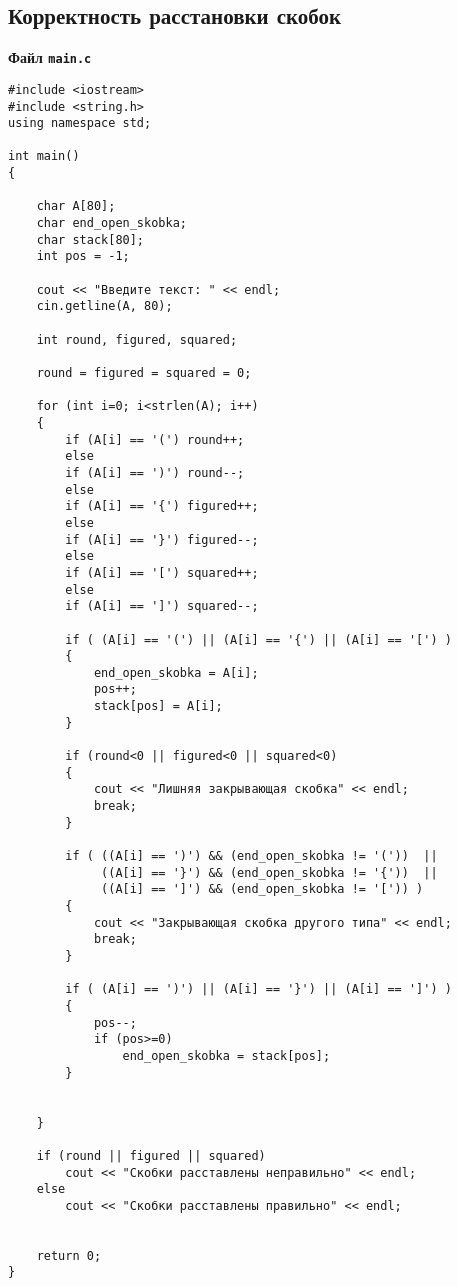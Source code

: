 \documentclass[a4paper,12pt]{extarticle}
\begin{document}
\subsection{Корректность расстановки скобок}\label{code:scobe}
\centerline{\textbf{Файл \texttt{main.c}}}
\begin{verbatim}
#include <iostream>
#include <string.h>
using namespace std;
 
int main()
{
 
    char A[80];
    char end_open_skobka; 
    char stack[80];
    int pos = -1;
 
    cout << "Введите текст: " << endl;
    cin.getline(A, 80);
 
    int round, figured, squared;
 
    round = figured = squared = 0;
 
    for (int i=0; i<strlen(A); i++)
    {
        if (A[i] == '(') round++;   
        else
        if (A[i] == ')') round--;     
        else
        if (A[i] == '{') figured++;
        else
        if (A[i] == '}') figured--;
        else
        if (A[i] == '[') squared++;  
        else
        if (A[i] == ']') squared--;     
 
        if ( (A[i] == '(') || (A[i] == '{') || (A[i] == '[') )
        {
            end_open_skobka = A[i];          
            pos++;                     
            stack[pos] = A[i];         
        }
 
        if (round<0 || figured<0 || squared<0)
        {
            cout << "Лишняя закрывающая скобка" << endl;
            break;
        }
 
        if ( ((A[i] == ')') && (end_open_skobka != '('))  ||
             ((A[i] == '}') && (end_open_skobka != '{'))  ||
             ((A[i] == ']') && (end_open_skobka != '[')) )
        {
            cout << "Закрывающая скобка другого типа" << endl;
            break;
        }
 
        if ( (A[i] == ')') || (A[i] == '}') || (A[i] == ']') )
        {
            pos--;                           
            if (pos>=0)
                end_open_skobka = stack[pos];
        }
 
 
    }
 
    if (round || figured || squared)
        cout << "Скобки расставлены неправильно" << endl;
    else
        cout << "Скобки расставлены правильно" << endl;
 
 
    return 0;
}
\end{verbatim}
\hrulefill
\end{document}
